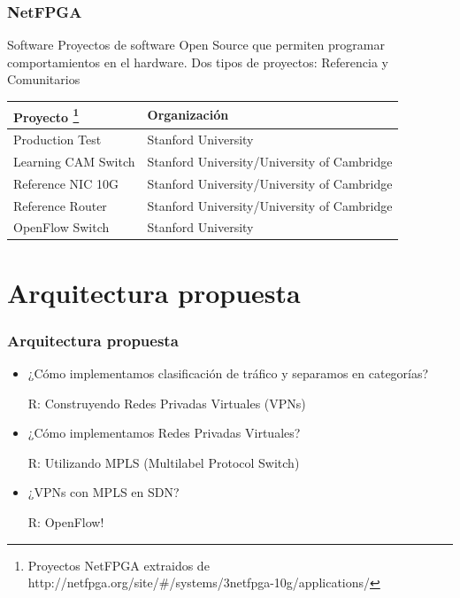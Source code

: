 \documentclass{beamer}
\begin{document}
\begin{frame}
\frametitle{NetFPGA} 
\begin{block}{Software}
Proyectos de software Open Source que permiten programar comportamientos en el hardware. Dos tipos de proyectos: Referencia y Comunitarios

\end{block}

\begin{table}[]
\small
\centering
\label{label}
\begin{tabular}{| p{3.7cm} | p{6.8cm} |}

\hline
\multicolumn{1}{|l|}{Proyecto \footnote[frame]{\tiny Proyectos NetFPGA extraidos de http://netfpga.org/site/\#/systems/3netfpga-10g/applications/}} & \multicolumn{1}{l|}{Organizaci\'on}\\
\hline
Production Test  & Stanford University \\
Learning CAM Switch &  Stanford University/University of Cambridge \\
Reference NIC 10G  &  Stanford University/University of Cambridge  \\
Reference Router  &  Stanford University/University of Cambridge  \\
\hline
OpenFlow Switch & Stanford University  \\
\hline  
\end{tabular}
\end{table}


\end{frame}






\section{Arquitectura propuesta} 
\frame{\tableofcontents[currentsection]}

\begin{frame}
\frametitle{Arquitectura propuesta} 

\begin{itemize}
\item ¿C\'omo implementamos clasificación de tr\'afico y separamos en categorías?

\pause
{\color{blue}R: Construyendo Redes Privadas Virtuales (VPNs)}
\pause

\vspace{0.5cm}
\item ¿C\'omo implementamos Redes Privadas Virtuales?

\pause
{\color{blue}R: Utilizando MPLS (Multilabel Protocol Switch)}

\pause
\vspace{0.5cm}
\item ¿VPNs con MPLS en SDN?

\pause
{\color{blue}R: OpenFlow!}

\end{itemize}

\end{frame}
\end{document}
